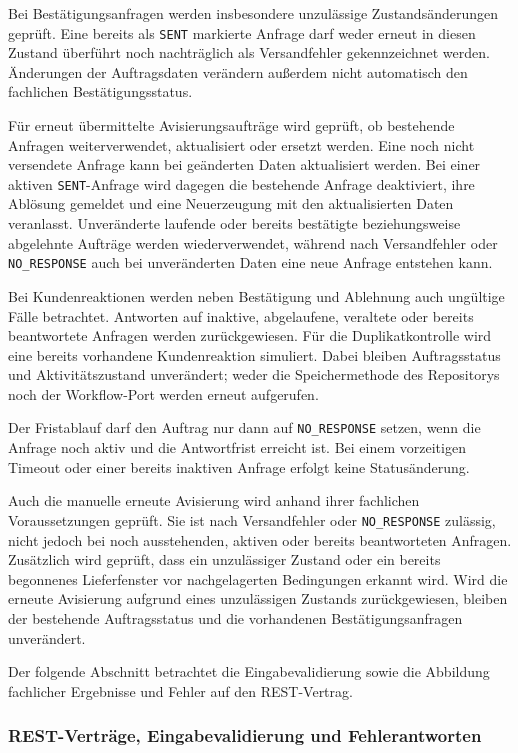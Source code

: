 Bei Bestätigungsanfragen werden insbesondere unzulässige Zustandsänderungen
geprüft. Eine bereits als \texttt{SENT} markierte Anfrage darf weder erneut in
diesen Zustand überführt noch nachträglich als Versandfehler gekennzeichnet
werden. Änderungen der Auftragsdaten verändern außerdem nicht automatisch den
fachlichen Bestätigungsstatus.

Für erneut übermittelte Avisierungsaufträge wird geprüft, ob bestehende Anfragen
weiterverwendet, aktualisiert oder ersetzt werden. Eine noch nicht versendete
Anfrage kann bei geänderten Daten aktualisiert werden. Bei einer aktiven
\texttt{SENT}-Anfrage wird dagegen die bestehende Anfrage deaktiviert, ihre
Ablösung gemeldet und eine Neuerzeugung mit den aktualisierten Daten veranlasst.
Unveränderte laufende oder bereits bestätigte beziehungsweise abgelehnte
Aufträge werden wiederverwendet, während nach Versandfehler oder
\texttt{NO\_RESPONSE} auch bei unveränderten Daten eine neue Anfrage entstehen
kann.

Bei Kundenreaktionen werden neben Bestätigung und Ablehnung auch ungültige Fälle
betrachtet. Antworten auf inaktive, abgelaufene, veraltete oder bereits
beantwortete Anfragen werden zurückgewiesen. Für die Duplikatkontrolle wird eine
bereits vorhandene Kundenreaktion simuliert. Dabei bleiben Auftragsstatus und
Aktivitätszustand unverändert; weder die Speichermethode des Repositorys noch
der Workflow-Port werden erneut aufgerufen.

Der Fristablauf darf den Auftrag nur dann auf \texttt{NO\_RESPONSE} setzen, wenn
die Anfrage noch aktiv und die Antwortfrist erreicht ist. Bei einem vorzeitigen
Timeout oder einer bereits inaktiven Anfrage erfolgt keine Statusänderung.

Auch die manuelle erneute Avisierung wird anhand ihrer fachlichen
Voraussetzungen geprüft. Sie ist nach Versandfehler oder \texttt{NO\_RESPONSE}
zulässig, nicht jedoch bei noch ausstehenden, aktiven oder bereits beantworteten
Anfragen. Zusätzlich wird geprüft, dass ein unzulässiger Zustand oder ein
bereits begonnenes Lieferfenster vor nachgelagerten Bedingungen erkannt wird.
Wird die erneute Avisierung aufgrund eines unzulässigen Zustands zurückgewiesen,
bleiben der bestehende Auftragsstatus und die vorhandenen
Bestätigungsanfragen unverändert.

Der folgende Abschnitt betrachtet die Eingabevalidierung sowie die Abbildung
fachlicher Ergebnisse und Fehler auf den REST-Vertrag.

\subsubsection{REST-Verträge, Eingabevalidierung und Fehlerantworten}
\label{sec:test-rest-vertraege-fehlerantworten}

